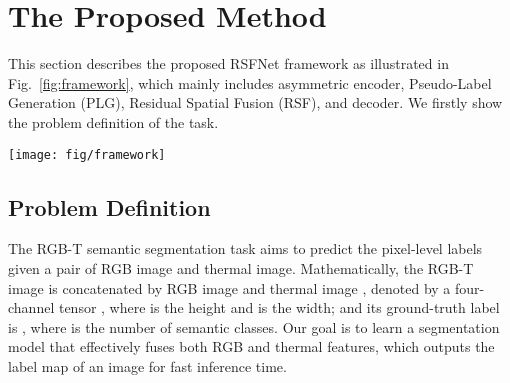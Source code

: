 \documentclass[10.5pt,twocolumn,journal,letterpaper]{IEEEtran}
\begin{document}
\section{The Proposed Method}
\label{method}
This section describes the proposed RSFNet framework as illustrated in Fig.~\ref{fig:framework}, which mainly includes asymmetric encoder, Pseudo-Label Generation (PLG), Residual Spatial Fusion (RSF), and decoder. We firstly show the problem definition of the task.

\begin{figure*}[!t]
	\centering
	\texttt{[image: fig/framework]}
	\caption{Overview of the proposed RSFNet framework. It consists of the encoder (the inner RGB branch and thermal branch), Residual Spatial Fusion (RSF) module (in the middle), decoder, and the pseudo-label generation module (the left-most RGB branch and the right-most thermal branch). A pair of RGB image and thermal image are fed to the asymmetric encoder to derive the confidence scores  by regression, and they are simultaneously input to the Pseudo-Label Generation (PLG) module to obtain the binary saliency map for computing the IoU scores  (soft labels), which are regarded as the pseudo-labels to supervise feature learning. The RSF module accepts both the confidence score and the intermediate feature map, yielding the cross-modal feature maps, which are then decoded to the label map as the final prediction.}
	\label{fig:framework}
\end{figure*}

\subsection{Problem Definition}
The RGB-T semantic segmentation task aims to predict the pixel-level labels given a pair of RGB image and thermal image. Mathematically, the RGB-T image is concatenated by RGB image  and thermal image , denoted by a four-channel tensor , where  is the height and  is the width; and its ground-truth label is , where  is the number of semantic classes. Our goal is to learn a segmentation model that effectively fuses both RGB and thermal features, which outputs the label map of an image for fast inference time.  
\end{document}
